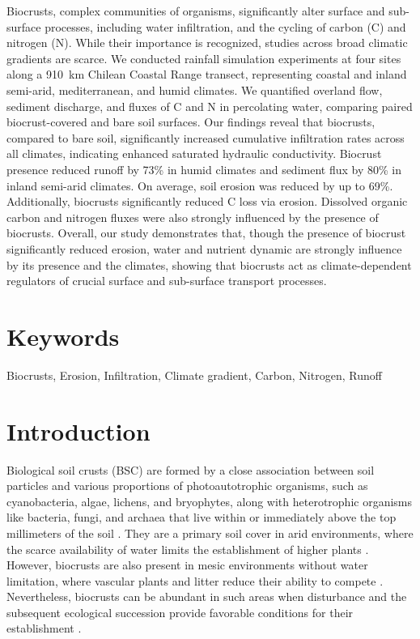 Biocrusts, complex communities of organisms, significantly alter surface and sub-surface processes, including water infiltration, and the cycling of carbon (C) and nitrogen (N). While their importance is recognized, studies across broad climatic gradients are scarce. We conducted rainfall simulation experiments at four sites along a \SI{910}{\kilo\meter} Chilean Coastal Range transect, representing coastal and inland semi-arid, mediterranean, and humid climates. We quantified overland flow, sediment discharge, and fluxes of C and N in percolating water, comparing paired biocrust-covered and bare soil surfaces. Our findings reveal that biocrusts, compared to bare soil, significantly increased cumulative infiltration rates across all climates, indicating enhanced saturated hydraulic conductivity. Biocrust presence reduced runoff by 73\% in humid climates and sediment flux by 80\% in inland semi-arid climates. On average, soil erosion was reduced by up to 69\%. Additionally, biocrusts significantly reduced C loss via erosion. Dissolved organic carbon and nitrogen fluxes were also strongly influenced by the presence of biocrusts. Overall, our study demonstrates that, though the presence of biocrust significantly reduced erosion, water and nutrient dynamic are strongly influence by its presence and the climates, showing that biocrusts act as climate-dependent regulators of crucial surface and sub-surface transport processes.

\section*{Keywords}

Biocrusts, Erosion, Infiltration, Climate gradient, Carbon, Nitrogen, Runoff

\section{Introduction}

Biological soil crusts (BSC) are formed by a close association between soil particles and various proportions of photoautotrophic organisms, such as cyanobacteria, algae, lichens, and bryophytes, along with heterotrophic organisms like bacteria, fungi, and archaea that live within or immediately above the top millimeters of the soil \citep{Weber2022}. They are a primary soil cover in arid environments, where the scarce availability of water limits the establishment of higher plants \citep{Ding2020,Weber2022}. However, biocrusts are also present in mesic environments without water limitation, where vascular plants and litter reduce their ability to compete \citep{Corbin2020,Gall2022a}. Nevertheless, biocrusts can be abundant in such areas when disturbance and the subsequent ecological succession provide favorable conditions for their establishment \citep{Budel2014,Gall2022a}.

